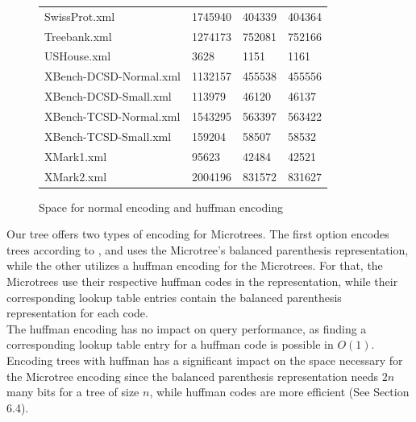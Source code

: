 \documentclass{article}
\begin{document}
\begin{figure}[h]
\begin{tabular}{ |p{4.5cm}||p{2cm}|p{2cm}|p{4cm}|  }
		 SwissProt.xml		&1745940	&404339	&404364	\\
		 Treebank.xml		&1274173	&752081	&752166	\\
		 USHouse.xml		&3628		&1151		&1161		\\
		 XBench-DCSD-Normal.xml	&1132157	&455538	&455556	\\
		 XBench-DCSD-Small.xml	&113979	&46120	&46137	\\
		 XBench-TCSD-Normal.xml	&1543295	&563397	&563422	\\
		 XBench-TCSD-Small.xml	&159204	&58507	&58532	\\
		 XMark1.xml			&95623	&42484	&42521	\\
		 XMark2.xml			&2004196	&831572	&831627	\\
		 \hline
	\end{tabular}
\caption{Space for normal encoding and huffman encoding}
\label{huff:table1}
\end{figure}
Our tree offers two types of encoding for Microtrees. The first option encodes trees according to \cite{farzanMunro}, and uses the Microtree's balanced parenthesis representation, while the other utilizes a huffman encoding for the Microtrees. For that, the Microtrees use their respective huffman codes in the representation, while their corresponding lookup table entries contain the balanced parenthesis representation for each code.\\
The huffman encoding has no impact on query performance, as finding a corresponding lookup table entry for a huffman code is possible in $O(1)$. Encoding trees with huffman has a significant impact on the space necessary for the Microtree encoding since the balanced parenthesis representation needs $2n$ many bits for a tree of size $n$, while huffman codes are more efficient (See Section 6.4).
\end{document}
